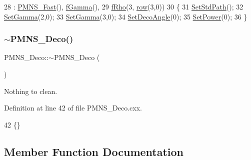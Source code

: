 \begin{DoxyCode}
28                      : \hyperlink{classOscProb_1_1PMNS__Fast_a2bbac744bf63753105d766a860af7c0d}{PMNS\_Fast}(), \hyperlink{classOscProb_1_1PMNS__Deco_ae2f30ac9f8b25344959f1698616d337a}{fGamma}(),
29 \hyperlink{classOscProb_1_1PMNS__Deco_a0488d62b4ef4cf5b43425769f5fcdbdf}{fRho}(3, \hyperlink{classOscProb_1_1PMNS__Deco_a430859c3da89582de577f8f7e75f2d16}{row}(3,0))
30 \{
31   \hyperlink{classOscProb_1_1PMNS__Base_add6533a9fc9acdfc7ae258b62570d78d}{SetStdPath}();
32   \hyperlink{classOscProb_1_1PMNS__Deco_ac06a9c503d1c5b4a43c4eb797881898d}{SetGamma}(2,0);
33   \hyperlink{classOscProb_1_1PMNS__Deco_ac06a9c503d1c5b4a43c4eb797881898d}{SetGamma}(3,0);
34   \hyperlink{classOscProb_1_1PMNS__Deco_a35e79054682aa88c55f4350c29336014}{SetDecoAngle}(0);
35   \hyperlink{classOscProb_1_1PMNS__Deco_afe7b8b9ae438d8b207bf75c2cfbb9fb8}{SetPower}(0);
36 \}
\end{DoxyCode}
\mbox{\label{classOscProb_1_1PMNS__Deco_a5539610ab44c510c204ae884fb8e2a0e}} 
\subsubsection{\texorpdfstring{$\sim$\+P\+M\+N\+S\+\_\+\+Deco()}{~PMNS\_Deco()}}
{\footnotesize\ttfamily P\+M\+N\+S\+\_\+\+Deco\+::$\sim$\+P\+M\+N\+S\+\_\+\+Deco (\begin{DoxyParamCaption}{ }\end{DoxyParamCaption})\hspace{0.3cm}{\ttfamily [virtual]}}

Nothing to clean. 

Definition at line 42 of file P\+M\+N\+S\+\_\+\+Deco.\+cxx.


\begin{DoxyCode}
42 \{\}
\end{DoxyCode}


\subsection{Member Function Documentation}
\mbox{\label{classOscProb_1_1PMNS__Base_a887dc9d4dc569ec0cdef3933b4c60efc}} 

